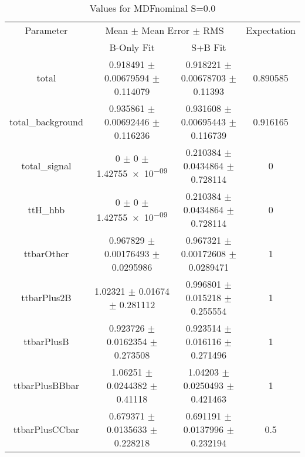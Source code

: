 \begin{table}
\centering
\caption{Values for MDFnominal S=0.0}
\begin{tabular}{cccc}
\toprule
Parameter & \multicolumn{2}{c}{Mean $\pm$ Mean Error $\pm$ RMS} & Expectation\\
 & B-Only Fit & S+B Fit & \\
\midrule
total & \num{0.918491} $\pm$ \num{0.00679594} $\pm$ \num{0.114079} & \num{0.918221} $\pm$ \num{0.00678703} $\pm$ \num{0.11393} & \num{0.890585}\\
total\_background & \num{0.935861} $\pm$ \num{0.00692446} $\pm$ \num{0.116236} & \num{0.931608} $\pm$ \num{0.00695443} $\pm$ \num{0.116739} & \num{0.916165}\\
total\_signal & \num{0} $\pm$ \num{0} $\pm$ \num{1.42755e-09} & \num{0.210384} $\pm$ \num{0.0434864} $\pm$ \num{0.728114} & \num{0}\\
ttH\_hbb & \num{0} $\pm$ \num{0} $\pm$ \num{1.42755e-09} & \num{0.210384} $\pm$ \num{0.0434864} $\pm$ \num{0.728114} & \num{0}\\
ttbarOther & \num{0.967829} $\pm$ \num{0.00176493} $\pm$ \num{0.0295986} & \num{0.967321} $\pm$ \num{0.00172608} $\pm$ \num{0.0289471} & \num{1}\\
ttbarPlus2B & \num{1.02321} $\pm$ \num{0.01674} $\pm$ \num{0.281112} & \num{0.996801} $\pm$ \num{0.015218} $\pm$ \num{0.255554} & \num{1}\\
ttbarPlusB & \num{0.923726} $\pm$ \num{0.0162354} $\pm$ \num{0.273508} & \num{0.923514} $\pm$ \num{0.016116} $\pm$ \num{0.271496} & \num{1}\\
ttbarPlusBBbar & \num{1.06251} $\pm$ \num{0.0244382} $\pm$ \num{0.41118} & \num{1.04203} $\pm$ \num{0.0250493} $\pm$ \num{0.421463} & \num{1}\\
ttbarPlusCCbar & \num{0.679371} $\pm$ \num{0.0135633} $\pm$ \num{0.228218} & \num{0.691191} $\pm$ \num{0.0137996} $\pm$ \num{0.232194} & \num{0.5}\\
\bottomrule
\end{tabular}
\end{table}